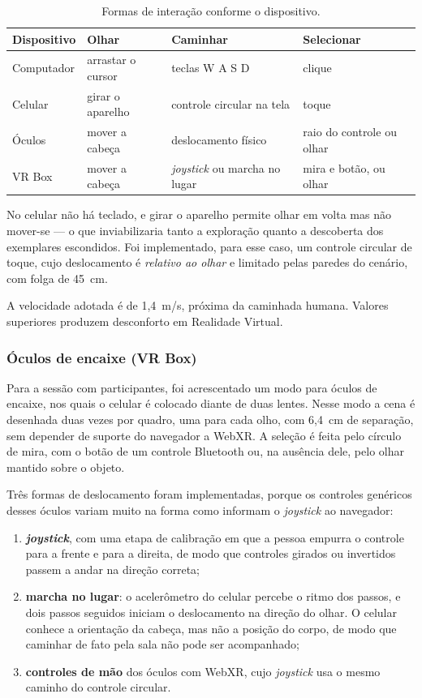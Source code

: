 \begin{table}[htbp]
\centering
\caption{Formas de interação conforme o dispositivo.}
\label{tab:controles}
\small
\begin{tabular}{p{2.2cm}p{2.6cm}p{3.5cm}p{3.6cm}}
\toprule
\textbf{Dispositivo} & \textbf{Olhar} & \textbf{Caminhar} & \textbf{Selecionar} \\
\midrule
Computador & arrastar o cursor & teclas W A S D & clique \\
Celular & girar o aparelho & controle circular na tela & toque \\
Óculos & mover a cabeça & deslocamento físico & raio do controle ou olhar \\
VR Box & mover a cabeça & \textit{joystick} ou marcha no lugar & mira e botão, ou olhar \\
\bottomrule
\end{tabular}
\end{table}

No celular não há teclado, e girar o aparelho permite olhar em volta mas
não mover-se --- o que inviabilizaria tanto a exploração quanto a
descoberta dos exemplares escondidos. Foi implementado, para esse caso,
um controle circular de toque, cujo deslocamento é \emph{relativo ao
olhar} e limitado pelas paredes do cenário, com folga de 45~cm.

A velocidade adotada é de 1,4~m/s, próxima da caminhada humana. Valores
superiores produzem desconforto em Realidade Virtual.

\subsubsection{Óculos de encaixe (VR Box)}

Para a sessão com participantes, foi acrescentado um modo para óculos de
encaixe, nos quais o celular é colocado diante de duas lentes. Nesse
modo a cena é desenhada duas vezes por quadro, uma para cada olho, com
6,4~cm de separação, sem depender de suporte do navegador a WebXR. A
seleção é feita pelo círculo de mira, com o botão de um controle
Bluetooth ou, na ausência dele, pelo olhar mantido sobre o objeto.

Três formas de deslocamento foram implementadas, porque os controles
genéricos desses óculos variam muito na forma como informam o
\textit{joystick} ao navegador:

\begin{enumerate}
  \item \textbf{\textit{joystick}}, com uma etapa de calibração em que a
  pessoa empurra o controle para a frente e para a direita, de modo que
  controles girados ou invertidos passem a andar na direção correta;
  \item \textbf{marcha no lugar}: o acelerômetro do celular percebe o
  ritmo dos passos, e dois passos seguidos iniciam o deslocamento na
  direção do olhar. O celular conhece a orientação da cabeça, mas não a
  posição do corpo, de modo que caminhar de fato pela sala não pode ser
  acompanhado;
  \item \textbf{controles de mão} dos óculos com WebXR, cujo
  \textit{joystick} usa o mesmo caminho do controle circular.
\end{enumerate}

